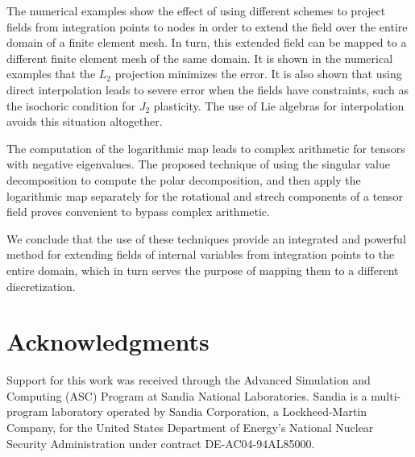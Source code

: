 \documentclass[12pt]{article}
\begin{document}
The numerical examples show the effect of using different schemes to project
fields from integration points to nodes in order to extend the field over the
entire domain of a finite element mesh. In turn, this extended field can be
mapped to a different finite element mesh of the same domain. It is shown in the
numerical examples that the $L_2$ projection minimizes the error.
It is also shown that using direct interpolation leads to severe error when the
fields have constraints, such as the isochoric condition for $J_2$ plasticity.
The use of Lie algebras for interpolation avoids this situation altogether.

The computation of the logarithmic map leads to complex arithmetic for tensors
with negative eigenvalues. The proposed technique of using the singular value
decomposition to compute the polar decomposition, and then apply the logarithmic
map separately for the rotational and strech components of a tensor field proves
convenient to bypass complex arithmetic.

We conclude that the use of these techniques provide an integrated and powerful
method for extending fields of internal variables from integration points to the
entire domain, which in turn serves the purpose of mapping them to a different
discretization.

\section{Acknowledgments}

Support for this work was received through the Advanced Simulation and Computing
(ASC) Program at Sandia National Laboratories. Sandia is a multi-program
laboratory operated by Sandia Corporation, a Lockheed-Martin Company, for the
United States Department of Energy's National Nuclear Security Administration
under contract DE-AC04-94AL85000.



\end{document}
